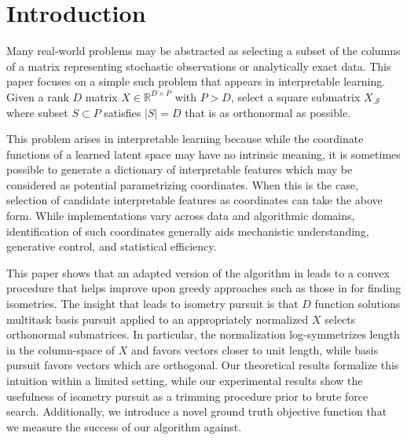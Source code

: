 \section{Introduction}
\label{sec:introduction}

Many real-world problems may be abstracted as selecting a subset of the columns of a matrix representing stochastic observations or analytically exact data.
This paper focuses on a simple such problem that appears in interpretable learning.
Given a rank $D$ matrix $ X \in \mathbb R^{D \times P}$ with $P > D$, select a square submatrix $ X_{.\mathcal S}$ where subset $ S \subset P$ satisfies $| S| = D$ that is as orthonormal as possible.

This problem arises in interpretable learning because while the coordinate functions of a learned latent space may have no intrinsic meaning, it is sometimes possible to generate a dictionary of interpretable features which may be considered as potential parametrizing coordinates.
When this is the case, selection of candidate interpretable features as coordinates can take the above form.
While implementations vary across data and algorithmic domains, identification of such coordinates generally aids mechanistic understanding, generative control, and statistical efficiency.

This paper shows that an adapted version of the algorithm in \citet{Koelle2024-no} leads to a convex procedure that helps improve upon greedy approaches such as those in \citet{5895106, NEURIPS2019_6a10bbd4, Kohli2021-lr, Jones2007-uc} for finding isometries.
The insight that leads to isometry pursuit is that $D$ function solutions multitask basis pursuit applied to an appropriately normalized $ X$ selects orthonormal submatrices.
In particular, the normalization log-symmetrizes length in the column-space of $ X$ and favors vectors closer to unit length, while basis pursuit favors vectors which are orthogonal.
Our theoretical results formalize this intuition within a limited setting, while our experimental results show the usefulness of isometry pursuit as a trimming procedure prior to brute force search.
Additionally, we introduce a novel ground truth objective function that we measure the success of our algorithm against.

